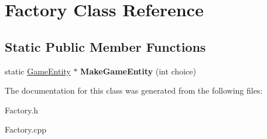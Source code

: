 \hypertarget{class_factory}{}\section{Factory Class Reference}
\label{class_factory}
\subsection*{Static Public Member Functions}
\begin{DoxyCompactItemize}
\item 
\hypertarget{class_factory_a97476bf4211007c219698e840261eef1}{}static \hyperlink{class_game_entity}{Game\+Entity} $\ast$ {\bfseries Make\+Game\+Entity} (int choice)\label{class_factory_a97476bf4211007c219698e840261eef1}

\end{DoxyCompactItemize}


The documentation for this class was generated from the following files\+:\begin{DoxyCompactItemize}
\item 
Factory.\+h\item 
Factory.\+cpp\end{DoxyCompactItemize}
